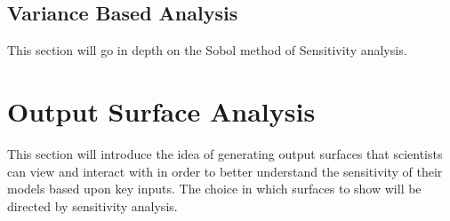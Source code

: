 \subsection{Variance Based Analysis\label{sec:sobol_sensitivity}}

This section will go in depth on the Sobol method of Sensitivity analysis.


\section{Output Surface Analysis\label{sec:surface_analysis}}

This section will introduce the idea of generating output surfaces that scientists can view and interact with in order to better understand the sensitivity of their models based upon key inputs. The choice in which surfaces to show will be directed by sensitivity analysis.
